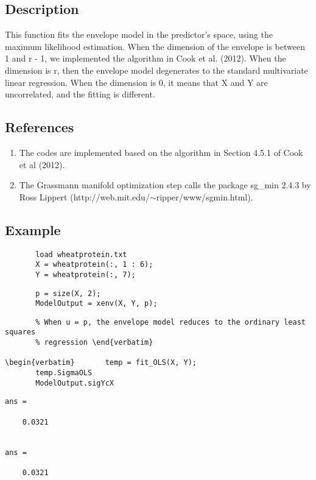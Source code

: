 \documentclass[a4paper,11pt,openany]{memoir}
\begin{document}
\subsection*{Description}

\begin{par}
This function fits the envelope model in the predictor's space, using the maximum likelihood estimation.  When the dimension of the envelope is between 1 and r - 1, we implemented the algorithm in Cook et al. (2012).  When the dimension is r, then the envelope model degenerates to the standard multivariate linear regression.  When the dimension is 0, it means that X and Y are uncorrelated, and the fitting is different.
\end{par} \vspace{1em}


\subsection*{References}

\begin{enumerate}
\setlength{\itemsep}{-1ex}
   \item The codes are implemented based on the algorithm in Section 4.5.1 of Cook et al (2012).
   \item The Grassmann manifold optimization step calls the package sg\_min 2.4.3 by Ross Lippert (http://web.mit.edu/$\sim$ripper/www/sgmin.html).
\end{enumerate}


\subsection*{Example}


\begin{verbatim}       load wheatprotein.txt
       X = wheatprotein(:, 1 : 6);
       Y = wheatprotein(:, 7);\end{verbatim}
    
\begin{verbatim}       p = size(X, 2);
       ModelOutput = xenv(X, Y, p);\end{verbatim}
    
\begin{verbatim}       % When u = p, the envelope model reduces to the ordinary least squares
       % regression \end{verbatim}
    
\begin{verbatim}       temp = fit_OLS(X, Y);
       temp.SigmaOLS
       ModelOutput.sigYcX\end{verbatim}
        \color{lightgray}\ttfamily \begin{verbatim}
ans =

    0.0321


ans =

    0.0321
    \end{verbatim} \rmfamily
\color{black}
\end{document}

